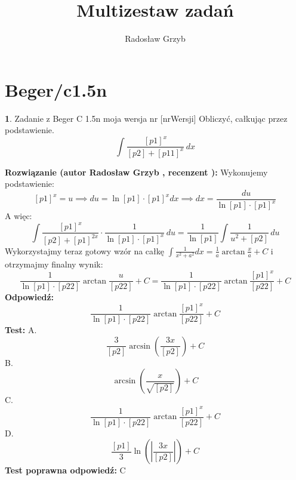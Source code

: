 \documentclass[12pt, a4paper]{article}
\title{Multizestaw zadań}
\author{Radosław Grzyb}
\date{}
\theoremstyle{definition} %
\newtheorem{zad}{}
\newcommand{\kategoria}[1]{\section{#1}} %
\newcommand{\zadStart}[1]{\begin{zad}#1\newline} %
\newcommand{\zadStop}{\end{zad}}   %
\newcommand{\rozwStart}[2]{\noindent \textbf{Rozwiązanie (autor #1 , recenzent #2): }\newline} %
\newcommand{\rozwStop}{\newline}                                            %
\newcommand{\odpStart}{\noindent \textbf{Odpowiedź:}\newline}    %
\newcommand{\odpStop}{\newline}                                             %
\newcommand{\testStart}{\noindent \textbf{Test:}\newline} %
\newcommand{\testStop}{\newline} %
\newcommand{\kluczStart}{\noindent \textbf{Test poprawna odpowiedź:}\newline} %
\newcommand{\kluczStop}{\newline} %
\begin{document}
\maketitle
\kategoria{Beger/c1.5n}
\zadStart{Zadanie z Beger C 1.5n moja wersja nr [nrWersji]}
Obliczyć, całkując przez podstawienie.
$$\int \frac{[p1]^{x}}{[p2]+[p11]^{x}} \,dx$$
\zadStop
\rozwStart{Radosław Grzyb}{}
Wykonujemy podstawienie:
$$[p1]^{x}=u\implies du=\ln[p1]\cdot[p1]^{x}dx\implies dx=\frac{du}{\ln[p1]\cdot[p1]^{x}}$$
A więc:
$$\int \frac{[p1]^{x}}{[p2]+[p1]^{2x}}\cdot\frac{1}{\ln[p1]\cdot[p1]^{x}} \,du=\frac{1}{\ln[p1]}\int \frac{1}{u^{2}+[p2]} \,du$$
Wykorzystajmy teraz gotowy wzór na całkę $\int\frac{1}{x^2+a^2}dx=\frac{1}{a}\arctan\frac{x}{a}+C$ i otrzymajmy finalny wynik:
$$\frac{1}{\ln[p1]\cdot[p22]}\arctan\frac{u}{[p22]}+C=\frac{1}{\ln[p1]\cdot[p22]}\arctan\frac{[p1]^{x}}{[p22]}+C$$
\rozwStop
\odpStart
$$\frac{1}{\ln[p1]\cdot[p22]}\arctan\frac{[p1]^{x}}{[p22]}+C$$
\odpStop
\testStart
A.$$\frac{3}{[p2]}\arcsin(\frac{3x}{[p2]})+C$$
B.$$\arcsin(\frac{x}{\sqrt{[p2]}})+C$$
C.$$\frac{1}{\ln[p1]\cdot[p22]}\arctan\frac{[p1]^{x}}{[p22]}+C$$
D.$$\frac{[p1]}{3}\ln(|\frac{3x}{[p2]}|)+C$$
\testStop
\kluczStart
C
\kluczStop
\end{document}
